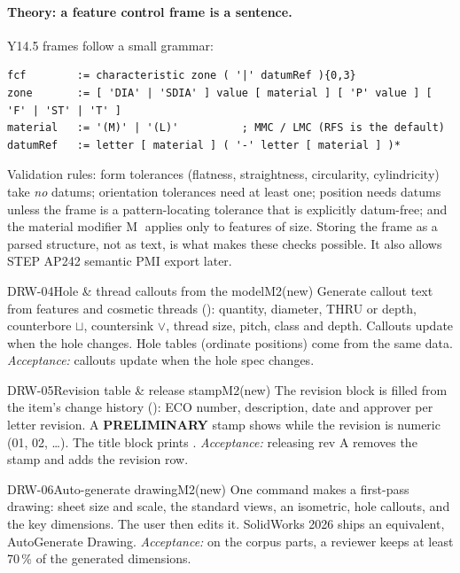 \paragraph{Theory: a feature control frame is a sentence.} Y14.5 frames follow a small grammar:
\begin{lstlisting}
fcf        := characteristic zone ( '|' datumRef ){0,3}
zone       := [ 'DIA' | 'SDIA' ] value [ material ] [ 'P' value ] [ 'F' | 'ST' | 'T' ]
material   := '(M)' | '(L)'          ; MMC / LMC (RFS is the default)
datumRef   := letter [ material ] ( '-' letter [ material ] )*
\end{lstlisting}
Validation rules: form tolerances (flatness, straightness, circularity, cylindricity) take \emph{no} datums;
orientation tolerances need at least one; position needs datums unless the frame is a pattern-locating tolerance
that is explicitly datum-free; and the material modifier \textcircled{\small M} applies only to features of size. Storing the
frame as a parsed structure, not as text, is what makes these checks possible. It also allows STEP AP242
semantic PMI export later.

\begin{epic}{DRW-04}{Hole \& thread callouts from the model}{M2}{\stTodo}{(new)}
Generate callout text from  features and cosmetic threads (): quantity, diameter,
THRU or depth, counterbore $\sqcup$, countersink $\vee$, thread size, pitch, class and depth. Callouts update
when the hole changes. Hole tables (ordinate positions) come from the same data.
\emph{Acceptance:} callouts update when the hole spec changes.
\end{epic}

\begin{epic}{DRW-05}{Revision table \& release stamp}{M2}{\stTodo}{(new)}
The revision block is filled from the item's change history (): ECO number, description, date and
approver per letter revision. A \textbf{PRELIMINARY} stamp shows while the revision is numeric (01, 02, \ldots).
The title block prints .
\emph{Acceptance:} releasing rev A removes the stamp and adds the revision row.
\end{epic}

\begin{epic}{DRW-06}{Auto-generate drawing}{M2}{\stTodo}{(new)}
One command makes a first-pass drawing: sheet size and scale, the standard views, an isometric, hole callouts,
and the key dimensions. The user then edits it. SolidWorks 2026 ships an equivalent, AutoGenerate Drawing.
\emph{Acceptance:} on the corpus parts, a reviewer keeps at least 70\,\% of the generated dimensions.
\end{epic}

